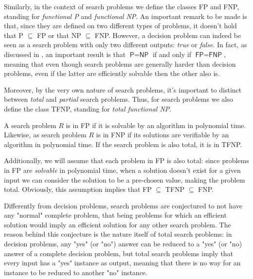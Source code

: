 Similarly, in the context of search problems we define the classes \textsf{FP} and \textsf{FNP}, standing for \textit{functional \textsf{P}} and \textit{functional \textsf{NP}}. An important remark to be made is that, since they are defined on two different types of problems, it doesn't hold that \textsf{P} $\subseteq$ \textsf{FP} or that \textsf{NP} $\subseteq$ \textsf{FNP}. However, a decision problem can indeed be seen as a search problem with only two different outputs: \textit{true} or \textit{false}. In fact, as discussed in \cite{decision_vs_search, rel_comp_np_search, fp_vs_p}, an important result is that $\textsf{P} = \textsf{NP} $ if and only if $\textsf{FP} = \textsf{FNP}$, meaning that even though search problems are generally harder than decision problems, even if the latter are efficiently solvable then the other also is.

Moreover, by the very own nature of search problems, it's important to distinct between \textit{total} and \textit{partial} search problems. Thus, for search problems we also define the class \textsf{TFNP}, standing for \textit{total functional \textsf{NP}}.

\begin{definition}
    A search problem $R$ is in \textsf{FP} if it is solvable by an algorithm in polynomial time. Likewise, as search problem $R$ is in \textsf{FNP} if its solutions are verifiable by an algorithm in polynomial time. If the search problem is also total, it is in \textsf{TFNP}.
\end{definition}

Additionally, we will assume that each problem in \textsf{FP} is also total: since problems in \textsf{FP} are \textit{solvable} in polynomial time, when a solution doesn't exist for a given input we can consider the solution to be a pre-chosen  value, making the problem total. Obviously, this assumption implies that \textsf{FP} $\subseteq$ \textsf{TFNP} $\subseteq$ \textsf{FNP}. 

Differently from decision problems, search problems are conjectured to not have any "normal" complete problem, that being problems for which an efficient solution would imply an efficient solution for any other search problem. The reason behind this conjecture is the nature itself of total search problems: in decision problems, any "yes" (or "no") answer can be reduced to a "yes" (or "no) answer of a complete decision problem, but total search problems imply that every input has a "yes" instance as output, meaning that there is no way for an instance to be reduced to another "no" instance.


